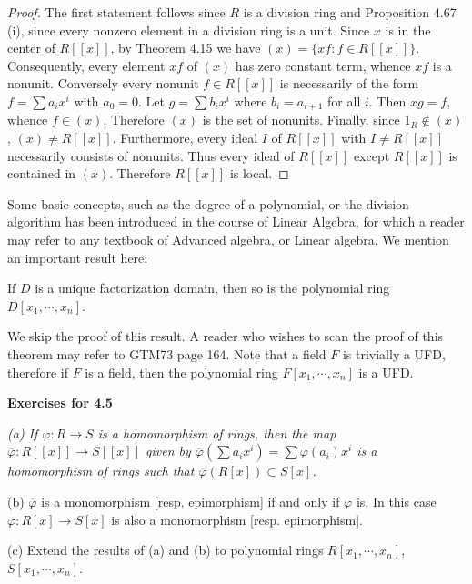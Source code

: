 \begin{proof}
The first statement follows since $R$ is a division ring and Proposition 4.67 (i), since every nonzero element in a division ring is a unit. Since $x$ is in the center of $R[[x]]$, by Theorem 4.15 we have $(x)=\{xf:f\in R[[x]]\}$. Consequently, every element $xf$ of $(x)$ has zero constant term, whence $xf$ is a nonunit. Conversely every nonunit $f\in R[[x]]$ is necessarily of the form $f=\sum a_ix^i$ with $a_0=0$. Let $g=\sum b_ix^i$ where $b_i=a_{i+1}$ for all $i$. Then $xg=f$, whence $f\in (x)$. Therefore $(x)$ is the set of nonunits. Finally, since $1_R\notin(x)$, $(x)\ne R[[x]]$. Furthermore, every ideal $I$ of $R[[x]]$ with $I\ne R[[x]]$ necessarily consists of nonunits. Thus every ideal of $R[[x]]$ except $R[[x]]$ is contained in $(x)$. Therefore $R[[x]]$ is local.
\end{proof}
Some basic concepts, such as the degree of a polynomial, or the division algorithm has been introduced in the course of Linear Algebra, for which a reader may refer to any textbook of Advanced algebra, or Linear algebra. We mention an important result here: 
\begin{theorem}
If $D$ is a unique factorization domain, then so is the polynomial ring $D[x_1,\cdots,x_n]$.
\end{theorem}
We skip the proof of this result. A reader who wishes to scan the proof of this theorem may refer to GTM73 page 164. Note that a field $F$ is trivially a UFD, therefore if $F$ is a field, then the polynomial ring $F[x_1,\cdots,x_n]$ is a UFD.
\begin{center}
\begin{large}
    \textbf{Exercises for 4.5}
\end{large}
\end{center}
\begin{problem}\em
(a) If $\varphi:R\to S$ is a homomorphism of rings, then the map $\overline{\varphi}:R[[x]]\to S[[x]]$ given by $\overline{\varphi}\left(\sum a_ix^i\right)=\sum\varphi(a_i)x^i$ is a homomorphism of rings such that $\overline{\varphi}(R[x])\subset S[x]$.\par
(b) $\overline{\varphi}$ is a monomorphism [resp. epimorphism] if and only if $\varphi$ is. In this case $\varphi:R[x]\to S[x]$ is also a monomorphism [resp. epimorphism].\par
(c) Extend the results of (a) and (b) to polynomial rings $R[x_1,\cdots,x_n]$, $S[x_1,\cdots,x_n]$.
\end{problem}
